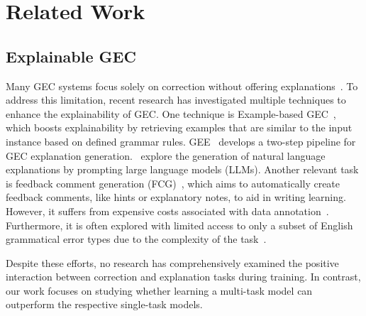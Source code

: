 \section{Related Work}
\label{sec:related_works}

\subsection{Explainable GEC}
Many GEC systems focus solely on correction without offering explanations~\citep{davis-etal-2024-prompting,ye2022focus,ye2023system}. To address this limitation, recent research has investigated multiple techniques to enhance the explainability of GEC. One technique is Example-based GEC~\citep{kaneko-etal-2022-interpretability,vasselli-watanabe-2023-closer}, which boosts explainability by retrieving examples that are similar to the input instance based on defined grammar rules. GEE~\citep{song-etal-2024-gee} develops a two-step pipeline for GEC explanation generation.~\citet{kaneko-okazaki-2024-controlled} explore the generation of natural language explanations by prompting large language models (LLMs). Another relevant task is feedback comment generation (FCG)~\citep{nagata-2019-toward,nagata-etal-2021-shared, hanawa-etal-2021-exploring}, which aims to automatically create feedback comments, like hints or explanatory notes, to aid in writing learning. However, it suffers from expensive costs associated with data annotation~\citep{nagata2020creating}. Furthermore, it is often explored with limited access to only a subset of English grammatical error types due to the complexity of the task~\citep{nagata-2019-toward}.

Despite these efforts, no research has comprehensively examined the positive interaction between correction and explanation tasks during training. In contrast, our work focuses on studying whether learning a multi-task model can outperform the respective single-task models.


